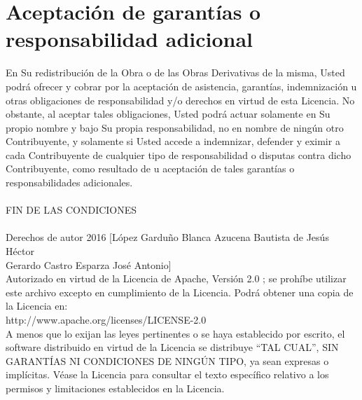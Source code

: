  \section{ Aceptación de garantías o responsabilidad adicional}En Su redistribución de la Obra o de las Obras Derivativas de la misma, Usted podrá ofrecer y cobrar por la aceptación de asistencia, garantías, indemnización u otras obligaciones de responsabilidad y/o derechos en virtud de esta Licencia. No obstante, al aceptar tales obligaciones, Usted podrá actuar solamente en Su propio nombre y bajo Su propia responsabilidad, no en nombre de ningún otro Contribuyente, y solamente si Usted accede a indemnizar, defender y eximir a cada Contribuyente de cualquier tipo de responsabilidad o disputas contra dicho Contribuyente, como resultado de u aceptación de tales garantías o responsabilidades adicionales.\\\\

FIN DE LAS CONDICIONES\\\\

Derechos de autor 2016 [López Garduño Blanca Azucena Bautista de Jesús Héctor \\Gerardo
Castro Esparza José Antonio]\\

   Autorizado en virtud de la Licencia de Apache, Versión 2.0 ; se prohíbe utilizar este archivo excepto en cumplimiento de la Licencia.
   Podrá obtener una copia de la Licencia en:\\

       http://www.apache.org/licenses/LICENSE-2.0\\

   A menos que lo exijan las leyes pertinentes o se haya establecido por escrito, el software distribuido en virtud de la Licencia se distribuye “TAL CUAL”, SIN GARANTÍAS NI CONDICIONES DE NINGÚN TIPO, ya sean expresas o implícitas.
   Véase la Licencia para consultar el texto específico relativo a los permisos y limitaciones establecidos en la Licencia.

